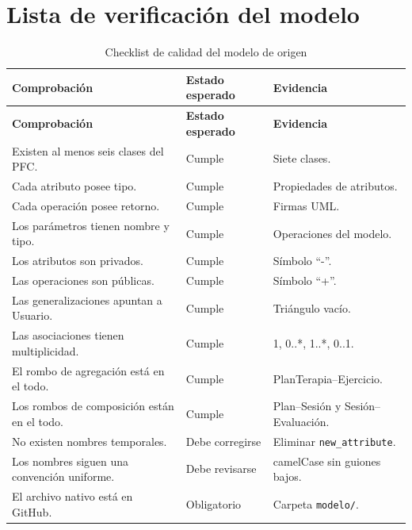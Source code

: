 \section{Lista de verificación del modelo}
\begin{longtable}{L{8.8cm}C{2.3cm}L{3cm}}
\caption{Checklist de calidad del modelo de origen}\\
\toprule
\textbf{Comprobación} & \textbf{Estado esperado} & \textbf{Evidencia} \\
\midrule
\endfirsthead
\toprule
\textbf{Comprobación} & \textbf{Estado esperado} & \textbf{Evidencia} \\
\midrule
\endhead
Existen al menos seis clases del PFC. & Cumple & Siete clases. \\
Cada atributo posee tipo. & Cumple & Propiedades de atributos. \\
Cada operación posee retorno. & Cumple & Firmas UML. \\
Los parámetros tienen nombre y tipo. & Cumple & Operaciones del modelo. \\
Los atributos son privados. & Cumple & Símbolo ``-''. \\
Las operaciones son públicas. & Cumple & Símbolo ``+''. \\
Las generalizaciones apuntan a Usuario. & Cumple & Triángulo vacío. \\
Las asociaciones tienen multiplicidad. & Cumple & 1, 0..*, 1..*, 0..1. \\
El rombo de agregación está en el todo. & Cumple & PlanTerapia--Ejercicio. \\
Los rombos de composición están en el todo. & Cumple & Plan--Sesión y Sesión--Evaluación. \\
No existen nombres temporales. & Debe corregirse & Eliminar \texttt{new\_attribute}. \\
Los nombres siguen una convención uniforme. & Debe revisarse & camelCase sin guiones bajos. \\
El archivo nativo está en GitHub. & Obligatorio & Carpeta \texttt{modelo/}. \\
\bottomrule
\end{longtable}

